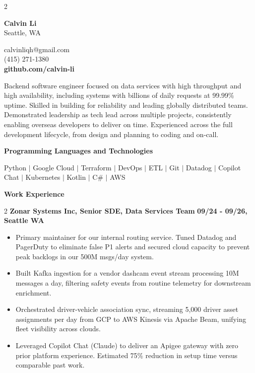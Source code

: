 \documentclass[]{article}
\begin{document}
\fontsize{9.5pt}{11.4pt}\selectfont
{}\begin{paracol}{2}

    {\huge \textbf{Calvin Li}}
    \\\medskip
    {\large Seattle, WA}
     
    \setlength{\columnsep}{1cm}
    \setlength{\columnseprule}{1px}
    \switchcolumn

    calvinliqh@gmail.com
    \\
    (415) 271-1380
    \\
    \textbf{github.com/calvin-li}

\end{paracol}

\bigskip
Backend software engineer focused on data services with high throughput and high availability, including systems with billions of daily requests at 99.99\% uptime. Skilled in building for reliability and leading globally distributed teams. Demonstrated leadership as tech lead across multiple projects, consistently enabling overseas developers to deliver on time. Experienced across the full development lifecycle, from design and planning to coding and on-call.

\bigskip
{\large \textbf{Programming Languages and Technologies}}\\
\smallskip
    \centerline{
        Python $|$
        Google Cloud $|$
        Terraform $|$
        DevOps $|$
        ETL $|$
        Git $|$
        Datadog $|$
        Copilot Chat $|$
        Kubernetes $|$
        Kotlin $|$
        C\# $|$
        AWS
    }
    \bigskip
    {\large \textbf{Work Experience}}\\
    \smallskip

    \begin{paracol}{2}
    \textbf{Zonar Systems Inc, Senior SDE, Data Services Team}
    \switchcolumn
    \textbf{09/24 - 09/26, Seattle WA}
    \end{paracol}
    \begin{itemize}
        \item Primary maintainer for our internal routing service. Tuned Datadog and PagerDuty to eliminate false P1 alerts and secured cloud capacity to prevent peak backlogs in our 500M msgs/day system.
        \item Built Kafka ingestion for a vendor dashcam event stream processing 10M messages a day, filtering safety events from routine telemetry for downstream enrichment.
        \item Orchestrated driver-vehicle association sync, streaming 5,000 driver asset assignments per day from GCP to AWS Kinesis via Apache Beam, unifying fleet visibility across clouds.
        \item Leveraged Copilot Chat (Claude) to deliver an Apigee gateway with zero prior platform experience. Estimated 75\% reduction in setup time versus comparable past work.
    \end{itemize}
    \smallskip
\end{document}
